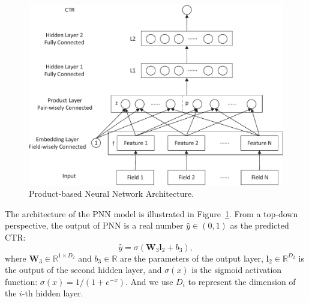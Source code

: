 \documentclass[conference]{IEEEtran}
\newcommand{\bs}{\boldsymbol}
\newcommand{\bW}{\bs{W}}
\newcommand{\bl}{\bs{l}}
\newcommand{\mR}{\mathbb{R}}
\newcommand{\kan}[1]{{\bf \color{green} [[Kan says ``#1'']]}}
\begin{document}

\begin{figure}[t]
	\centering
	\includegraphics[width=1\columnwidth]{figure/pnn-arch-v-crop.pdf}
	\caption{Product-based Neural Network Architecture.}\label{fig:pnn}
\end{figure}

The architecture of the PNN model is illustrated in Figure~\ref{fig:pnn}.
From a top-down perspective, the output of PNN is a real number $\hat{y} \in ( 0, 1 )$ as the predicted CTR:
\begin{equation}
\hat{y} = \sigma(\bW_3 \bl_2 + b_3), \label{eq:output}
\end{equation}
where $\bW_3 \in \mR^{1 \times D_2}$ and $b_3 \in \mR$ are the parameters of the output layer, $\bl_2 \in \mR^{D_2}$ is the output of the second hidden layer, and $\sigma(x)$ is the sigmoid activation function: $\sigma(x)= 1 / (1 + e^{-x})$. And we use $D_i$ to represent the dimension of the $i$-th hidden layer.
\end{document}
